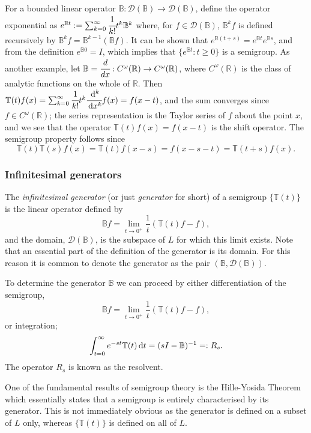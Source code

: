 For a bounded linear operator \(\mathbb B:\mathcal D(\mathbb B)\to \mathcal D(\mathbb B)\), define the operator exponential as \(e^{\mathbb Bt}:=\sum_{k=0}^\infty\cfrac{1}{k!}t^k\mathbb B^k\) where, for \(f\in \mathcal D(\mathbb B)\), \(\mathbb B^kf\) is defined recursively by \(\mathbb B^k f = \mathbb B^{k-1} (\mathbb B f)\). It can be shown that \(e^{\mathbb B(t+s)}=e^{\mathbb Bt}e^{\mathbb Bs}\), and from the definition \(e^{\mathbb B0}=I\), which implies that \(\{e^{\mathbb Bt}:t\geq 0\}\) is a semigroup. As another example, let \(\mathbb B=\cfrac{d}{dx}:C^\omega(\mathbb R) \to C^\omega(\mathbb R)\), where \(C^\omega(\mathbb R)\) is the class of analytic functions on the whole of \(\mathbb R\). Then \(\mathbb T(t)f(x)=\sum_{k=0}^\infty \cfrac{1}{k!}t^k\cfrac{\, \mathrm{d}^k}{\, \mathrm{d} x^k}f(x)=f(x-t)\), and the sum converges since \(f\in C^\omega(\mathbb R)\); the series representation is the Taylor series of \(f\) about the point \(x\), and we see that the operator \(\mathbb T(t)f(x)=f(x-t)\) is the shift operator. The semigroup property follows since 
\[\mathbb T(t)\mathbb T(s)f(x)=\mathbb T(t)f(x-s)=f(x-s-t)=\mathbb T(t+s)f(x).\]

\subsubsection{Infinitesimal generators} The \emph{infinitesimal generator} (or just \emph{generator} for short) of a semigroup \(\{\mathbb T(t)\}\) is the linear operator defined by 
\[\mathbb Bf = \lim\limits_{t\to 0^+}\frac{1}{t}(\mathbb T(t)f-f),\]
and the domain, \(\mathcal D(\mathbb B)\), is the subspace of \(L\) for which this limit exists. Note that an essential part of the definition of the generator is its domain. For this reason it is common to denote the generator as the pair \((\mathbb B,\mathcal D(\mathbb B))\). 

To determine the generator \(\mathbb B\) we can proceed by either differentiation of the semigroup, 
\[\mathbb Bf = \lim\limits_{t\to 0^+}\frac{1}{t}(\mathbb T(t)f-f),\]
or integration;
\[\int_{t=0}^\infty e^{-st}\mathbb T(t)\, \mathrm{d} t = (sI-\mathbb B)^{-1}=:R_s.\]
The operator \(R_s\) is known as the resolvent. 

One of the fundamental results of semigroup theory is the Hille-Yosida Theorem which essentially states that a semigroup is entirely characterised by its generator. This is not immediately obvious as the generator is defined on a subset of \(L\) only, whereas \(\{\mathbb T(t)\}\) is defined on all of \(L\).

